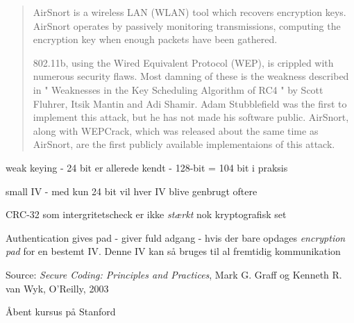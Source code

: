 \documentclass[20pt,landscape,a4paper,footrule]{foils}
\begin{document}


\begin{quote}
AirSnort is a wireless LAN (WLAN) tool which recovers encryption
keys. AirSnort operates by passively monitoring transmissions,
computing the encryption key when enough packets have been gathered.  

802.11b, using the Wired Equivalent Protocol (WEP), is crippled with
numerous security flaws. Most damning of these is the weakness
described in " Weaknesses in the Key Scheduling Algorithm of RC4 "
by Scott Fluhrer, Itsik Mantin and Adi Shamir. Adam Stubblefield
was the first to implement this attack, but he has not made his
software public. AirSnort, along with WEPCrack, which was released
about the same time as AirSnort, are the first publicly available
implementaions of this attack.  
\end{quote}



\begin{list1}
\item weak keying - 24 bit er allerede kendt - 128-bit = 104 bit i praksis
\item small IV - med kun 24 bit vil hver IV blive genbrugt oftere
\item CRC-32 som intergritetscheck er ikke \emph{stærkt} nok
  kryptografisk set
\item Authentication gives pad - giver fuld adgang - hvis der bare
  opdages \emph{encryption pad} for en bestemt IV. Denne IV kan så
  bruges til al fremtidig kommunikation
\end{list1}
Source: 
\emph{Secure Coding: Principles and Practices}, Mark G. Graff
  og Kenneth R. van Wyk, O'Reilly, 2003



Åbent kursus på Stanford\\
\end{document}
